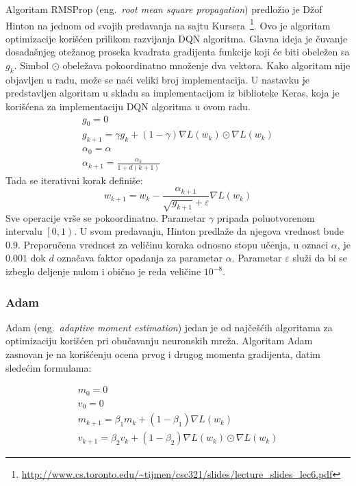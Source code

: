 Algoritam RMSProp (eng.~{\em root mean square propagation}) predložio je Džof Hinton na jednom od svojih predavanja na sajtu Kursera~\footnote{\url{http://www.cs.toronto.edu/~tijmen/csc321/slides/lecture_slides_lec6.pdf}}. Ovo je algoritam optimizacije korišćen prilikom razvijanja DQN algoritma. Glavna ideja je čuvanje dosadašnjeg otežanog proseka kvadrata gradijenta funkcije koji će biti obeležen sa $g_k$. Simbol $\odot$ obeležava pokoordinatno množenje dva vektora. Kako algoritam nije objavljen u radu, može se naći veliki broj implementacija. U nastavku je predstavljen algoritam u skladu sa implementacijom iz biblioteke Keras, koja je korišćena za implementaciju DQN algoritma u ovom radu.
\begin{equation}
	\begin{gathered}
		g_0 = 0 \\
		g_{k+1} = \gamma g_k + (1 - \gamma)\nabla L(w_k) \odot \nabla L(w_k) \\
		\alpha_0 = \alpha \\
		\alpha_{k+1} = \frac{\alpha_k}{1+d(k+1)}	
	\end{gathered}
\end{equation}
Tada se iterativni korak definiše: 
\begin{equation}
	w_{k+1} = w_k - \frac{\alpha_{k+1}}{\sqrt{g_{k+1}} + \varepsilon} \nabla L(w_k)
\end{equation}
Sve operacije vrše se pokoordinatno. Parametar $\gamma$ pripada poluotvorenom intervalu $\left[0, 1\right) $. U svom predavanju, Hinton predlaže da njegova vrednost bude $0.9$. Preporučena vrednost za veličinu koraka odnosno stopu učenja, u oznaci $\alpha$, je $0.001$ dok $d$ označava faktor opadanja za parametar $\alpha$. Parametar $\varepsilon$ služi da bi se izbeglo deljenje nulom i obično je reda veličine $10^{-8}$.

\subsubsection{Adam}

Adam (eng.~{\em adaptive moment estimation}) jedan je od najčešćih algoritama za optimizaciju korišćen pri obučavanju neuronskih mreža. Algoritam Adam zasnovan je na korišćenju ocena prvog i drugog momenta gradijenta, datim sledećim formulama:

\begin{equation}
	\begin{gathered}
			m_0 = 0 \\
			v_0 = 0 \\ 
			m_{k+1} = \beta_1 m_k + (1-\beta_1) \nabla L(w_k) \\
			v_{k+1} = \beta_2 v_k + (1-\beta_2) \nabla L(w_k) \odot \nabla L(w_k) 
	\end{gathered}
\end{equation}


